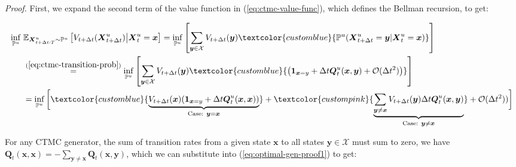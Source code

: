 \documentclass{article}
\newcommand{\bluetext}[1]{\textcolor{customblue}{#1}}
\newcommand{\pinktext}[1]{\textcolor{custompink}{#1}}
\begin{document}
\textit{Proof.} First, we expand the second term of the value function in (\ref{eq:ctmc-value-func}), which defines the Bellman recursion, to get:
\begin{small}
\begin{align}
    \inf_{\mathbb{P}^u}\; &\mathbb{E}_{\boldsymbol{X}^u_{t+\Delta t:T}\sim \mathbb{P}^u}\left[V_{t+\Delta t}(\boldsymbol{X}^u_{t+\Delta t})\big |\boldsymbol{X}^u_t=\boldsymbol{x}\right]=\inf_{\mathbb{P}^u}\left[\sum_{\boldsymbol{y}\in \mathcal{X}}V_{t+\Delta t}(\boldsymbol{y})\bluetext{\mathbb{P}^u(\boldsymbol{X}^u_{t+\Delta t}=\boldsymbol{y}|\boldsymbol{X}^u_t=\boldsymbol{x})}\right]\nonumber\\
    &\overset{(\ref{eq:ctmc-transition-prob})}{=}\inf_{\mathbb{P}^u}\left[\sum_{\boldsymbol{y}\in \mathcal{X}}V_{t+\Delta t}(\boldsymbol{y})\bluetext{\left(\boldsymbol{1}_{\boldsymbol{x}=y}+\Delta t\boldsymbol{Q}_t^u(\boldsymbol{x},\boldsymbol{y})+\mathcal{O}(\Delta t^2)\right)}\right]\nonumber\\
    &=\inf_{\mathbb{P}^u}\bigg[\bluetext{\underbrace{V_{t+\Delta t}(\boldsymbol{x})(\boldsymbol{1}_{\boldsymbol{x}=y}+\Delta t\boldsymbol{Q}_t^u(\boldsymbol{x},\boldsymbol{x}))}_{\text{Case: }\boldsymbol{y}=\boldsymbol{x}}}+\pinktext{\underbrace{\sum_{\boldsymbol{y}\neq \boldsymbol{x}}V_{t+\Delta t}(\boldsymbol{y})\Delta t\boldsymbol{Q}_t^u(\boldsymbol{x},\boldsymbol{y})}_{\text{Case: }\boldsymbol{y}\neq\boldsymbol{x}}}+\mathcal{O}(\Delta t^2))\bigg]\label{eq:optimal-gen-proof1}
\end{align}
\end{small}
For any CTMC generator, the sum of transition rates from a given state $\boldsymbol{x}$ to all states $\boldsymbol{y}\in \mathcal{X}$ must sum to zero, we have  $\boldsymbol{Q}_t(\boldsymbol{x},\boldsymbol{x})=-\sum_{\boldsymbol{y}\neq \boldsymbol{x}}\boldsymbol{Q}_t(\boldsymbol{x},\boldsymbol{y})$, which we can substitute into (\ref{eq:optimal-gen-proof1}) to get:
\end{document}
